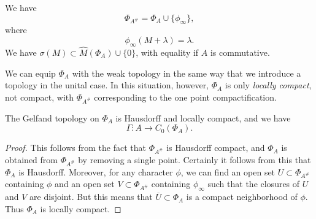 \begin{corollary}
    We have
    \[ \Phi_{A^\#} = \Phi_A \cup \{ \phi_\infty \}, \]
    where
    \[ \phi_\infty(M + \lambda) = \lambda. \]
    We have $\sigma(M) \subset \widehat{M}(\Phi_A) \cup \{ 0 \}$, with equality if $A$ is commutative.
\end{corollary}

We can equip $\Phi_A$ with the weak topology in the same way that we introduce a topology in the unital case. In this situation, however, $\Phi_A$ is only \emph{locally compact}, not compact, with $\Phi_{A^\#}$ corresponding to the one point compactification.

\begin{theorem}
    The Gelfand topology on $\Phi_A$ is Hausdorff and locally compact, and we have
    \[ \Gamma: A \to C_0(\Phi_A). \]
\end{theorem}
\begin{proof}
    This follows from the fact that $\Phi_{A^\#}$ is Hausdorff compact, and $\Phi_A$ is obtained from $\Phi_{A^\#}$ by removing a single point. Certainly it follows from this that $\Phi_A$ is Hausdorff. Moreover, for any character $\phi$, we can find an open set $U \subset \Phi_{A^\#}$ containing $\phi$ and an open set $V \subset \Phi_{A^\#}$ containing $\phi_\infty$ such that the closures of $U$ and $V$ are disjoint. But this means that $\overline{U} \subset \Phi_A$ is a compact neighborhood of $\phi$. Thus $\Phi_A$ is locally compact.
%
%
%
\end{proof}

